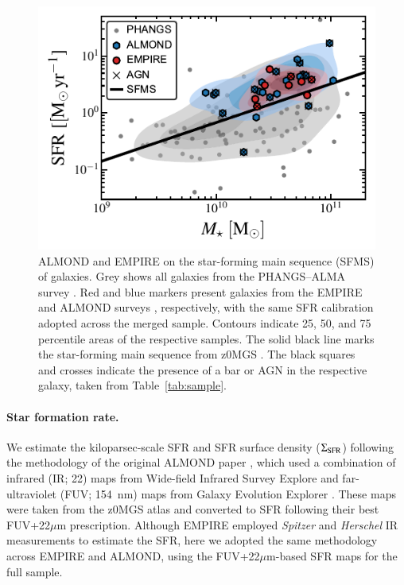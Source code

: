 \documentclass[letter, longauth]{aa} %
\begin{document}
\begin{figure}
\centering
\includegraphics[width=\columnwidth]{Figures/ALMOND+EMPIRE_SFMS_compressed_v2.pdf}
\caption{ALMOND and EMPIRE on the star-forming main sequence (SFMS) of galaxies.
Grey shows all galaxies from the PHANGS--ALMA survey \citep{Leroy2021b}.
Red and blue markers present galaxies from the EMPIRE \citep{Jimenez-Donaire2019} and ALMOND surveys \citep{Neumann2023a}, respectively, with the same SFR calibration adopted across the merged sample.
Contours indicate 25, 50, and 75 percentile areas of the respective samples.
The solid black line marks the star-forming main sequence from z0MGS \citep{Leroy2019}.
The black squares and crosses indicate the presence of a bar or AGN in the respective galaxy, taken from Table~\ref{tab:sample}.
}
\label{fig:sfms}
\end{figure}

\paragraph{Star formation rate.}
We estimate the kiloparsec-scale SFR and SFR surface density ($\Sigma_{\rm SFR}$) following the methodology of the original ALMOND paper \citep{Neumann2023a}, which used a combination of infrared (IR; \SI{22}{\micron}) maps from Wide-field Infrared Survey Explore \citep[WISE;][]{Wright2010} and far-ultraviolet (FUV; \SI{154}{nm}) maps from Galaxy Evolution Explorer \citep[GALEX;][]{Martin2005}. These maps were taken from the z0MGS atlas \citep{Leroy2019} and converted to SFR following their best FUV+22$\mu$m prescription. Although EMPIRE employed \textit{Spitzer} and \textit{Herschel} IR measurements to estimate the SFR, here we adopted the same methodology across EMPIRE and ALMOND, using the FUV+22$\mu$m-based SFR maps for the full sample.
\end{document}
